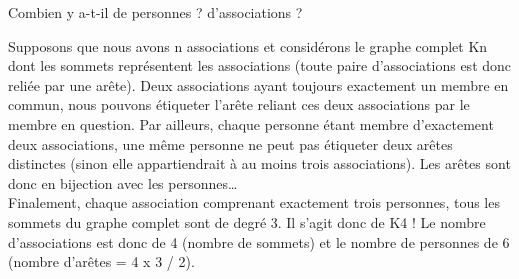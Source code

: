 \documentclass[10pt,a4paper]{article}
\begin{document}
Combien y a-t-il de personnes ? d’associations ?

\begin{tcolorbox}
Supposons que nous avons n associations et considérons le graphe complet Kn dont les sommets représentent les associations (toute paire d’associations est donc reliée par une arête). Deux associations ayant toujours exactement un membre en commun, nous pouvons étiqueter l’arête reliant ces deux associations par le membre en question. Par ailleurs, chaque personne étant membre d’exactement deux associations, une même personne ne peut pas étiqueter deux arêtes distinctes (sinon elle appartiendrait à au moins trois associations). Les arêtes sont donc en bijection avec les personnes…\\

Finalement, chaque association comprenant exactement trois personnes, tous les sommets du graphe complet sont de degré 3. Il s’agit donc de K4 ! Le nombre d’associations est donc de 4 (nombre de sommets) et le nombre de personnes de 6 (nombre d’arêtes = 4 x 3 / 2).
\end{tcolorbox}
\end{document}
